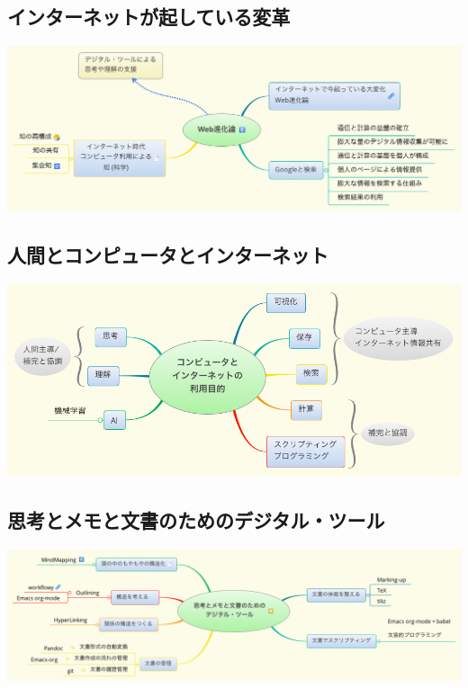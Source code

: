 \documentclass[dvipdfmx,11pt]{jarticle}
\begin{document}
\subsection{インターネットが起している変革}
\label{sec:org3c1e60f}
\begin{center}
\includegraphics[width=.9\linewidth]{./map-images/04-Web_revolution.png}
\end{center}

\subsection{人間とコンピュータとインターネット}
\label{sec:org6336cc7}
\begin{center}
\includegraphics[width=.9\linewidth]{./map-images/03-how_to_use_computer_and_internet.png}
\end{center}

\subsection{思考とメモと文書のためのデジタル・ツール}
\label{sec:org3634110}
\begin{center}
\includegraphics[width=.9\linewidth]{./map-images/05-digital_tools_for_thinking.png}
\end{center}
\end{document}
